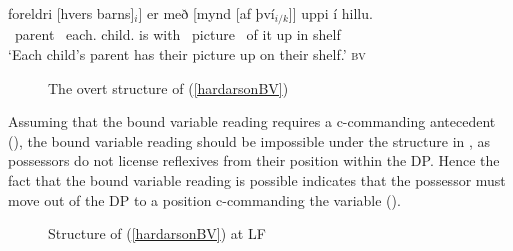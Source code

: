 \documentclass[output=paper]{langscibook}
\begin{document}
\begin{exe}
	\ex	\gll {[}foreldri [hvers barns]$_i$] er með [mynd [af því$_{i/k}$]] uppi í hillu. \label{hardarsonBV}\\
			~parent ~each.{\hardGen} child.{\hardGen} is with ~picture ~of it up in shelf\\
		\glt	`Each child's parent has their picture up on their shelf.' \hfill \textsc{bv}
\end{exe}

 

\begin{figure}
\caption{The overt structure of (\ref{hardarsonBV}) \label{hardarsonObvstr}}
\end{figure}

Assuming that the bound variable reading requires a c-commanding antecedent (\citealt{Reinhart:1983vx}), the bound variable reading should be impossible under the structure in , as possessors do not license reflexives from their position within the DP. Hence the fact that the bound variable reading is possible indicates that the possessor must move out of the DP to a position c-commanding the variable ().

\begin{figure}
\caption{Structure of (\ref{hardarsonBV}) at LF \label{hardarsonbvstr}}
\end{figure}
\end{document}
